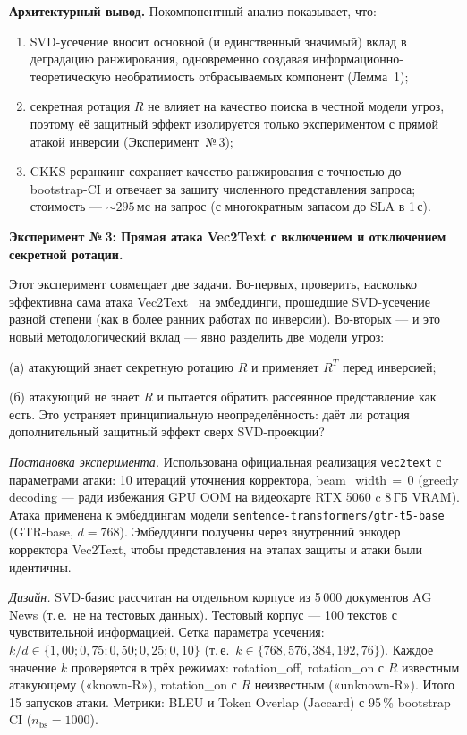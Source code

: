 \documentclass[a4paper, 12pt, oneside, openany]{article}
\begin{document}
\textbf{Архитектурный вывод.} Покомпонентный анализ показывает, что:
\begin{enumerate}
	\def\labelenumi{(\arabic{enumi})}
	\item SVD-усечение вносит основной (и единственный значимый) вклад в деградацию ранжирования, одновременно создавая информационно-теоретическую необратимость отбрасываемых компонент (Лемма~1);
	\item секретная ротация $R$ не влияет на качество поиска в честной модели угроз, поэтому её защитный эффект изолируется только экспериментом с прямой атакой инверсии (Эксперимент~№\,3);
	\item CKKS-реранкинг сохраняет качество ранжирования с точностью до bootstrap-CI и отвечает за защиту численного представления запроса; стоимость --- $\sim 295$\,мс на запрос (с многократным запасом до SLA в 1\,с).
\end{enumerate}

\textbf{Эксперимент №\,3: Прямая атака Vec2Text с включением и отключением секретной ротации.}

Этот эксперимент совмещает две задачи. Во-первых, проверить, насколько эффективна сама атака Vec2Text~\cite{ref5} на эмбеддинги, прошедшие SVD-усечение разной степени (как в более ранних работах по инверсии). Во-вторых --- и это новый методологический вклад --- явно разделить две модели угроз: 

(а) атакующий знает секретную ротацию $R$ и применяет $R^{T}$ перед инверсией;

(б) атакующий не знает $R$ и пытается обратить рассеянное представление как есть. Это устраняет принципиальную неопределённость: даёт ли ротация дополнительный защитный эффект сверх SVD-проекции?

\emph{Постановка эксперимента.} Использована официальная реализация \texttt{vec2text} с параметрами атаки: 10 итераций уточнения корректора, beam\_width\,$=\,0$ (greedy decoding --- ради избежания GPU OOM на видеокарте RTX 5060 c 8\,ГБ VRAM). Атака применена к эмбеддингам модели \texttt{sentence-transformers/gtr-t5-base} (GTR-base, $d = 768$). Эмбеддинги получены через внутренний энкодер корректора Vec2Text, чтобы представления на этапах защиты и атаки были идентичны.


\emph{Дизайн.} SVD-базис рассчитан на отдельном корпусе из 5\,000 документов AG News (т.\,е.\ не на тестовых данных). Тестовый корпус --- 100 текстов с чувствительной информацией. Сетка параметра усечения: $k/d \in \{1{,}00; 0{,}75; 0{,}50; 0{,}25; 0{,}10\}$ (т.\,е.\ $k \in \{768, 576, 384, 192, 76\}$). Каждое значение $k$ проверяется в трёх режимах: rotation\_off, rotation\_on с $R$ известным атакующему («known-R»), rotation\_on с $R$ неизвестным («unknown-R»). Итого 15 запусков атаки. Метрики: BLEU и Token Overlap (Jaccard) с 95\,\% bootstrap CI ($n_{\text{bs}} = 1000$).
\end{document}

